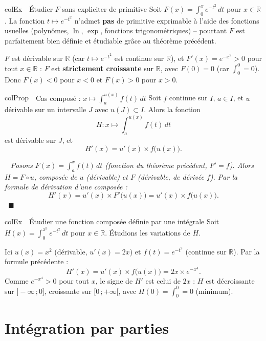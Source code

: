 \documentclass[11pt,a4paper]{article}
\newenvironment{propriete}[1][Propriété]
  {\begin{fiche}{colProp}{\ding{72}~~#1}}{\end{fiche}}
\newenvironment{exemple}[1][Exemple]
  {\begin{fiche}{colEx}{\ding{217}~~#1}}{\end{fiche}}
\newenvironment{demo}
  {\par\smallskip\noindent{\sffamily\bfseries\color{qtealdark}Démonstration.}\ \itshape}
  {\ \normalfont\hfill$\blacksquare$\par\medskip}
\begin{document}
\begin{exemple}[Étudier $F$ sans expliciter de primitive]
Soit $F(x)=\displaystyle\int_0^xe^{-t^2}\,dt$ pour $x\in\mathbb{R}$. La fonction $t\mapsto e^{-t^2}$ n'admet \textbf{pas} de primitive exprimable à l'aide des fonctions usuelles (polynômes, $\ln$, $\exp$, fonctions trigonométriques) -- pourtant $F$ est parfaitement bien définie et étudiable grâce au théorème précédent.

\smallskip
$F$ est dérivable sur $\mathbb{R}$ (car $t\mapsto e^{-t^2}$ est continue sur $\mathbb{R}$), et $F'(x)=e^{-x^2}>0$ pour tout $x\in\mathbb{R}$ : $F$ est \textbf{strictement croissante} sur $\mathbb{R}$, avec $F(0)=0$ (car $\int_0^0=0$). Donc $F(x)<0$ pour $x<0$ et $F(x)>0$ pour $x>0$.
\end{exemple}

\begin{propriete}[Cas composé : $x\mapsto\int_a^{u(x)}f(t)\,dt$]
Soit $f$ continue sur $I$, $a\in I$, et $u$ dérivable sur un intervalle $J$ avec $u(J)\subset I$. Alors la fonction
\[
  H : x \longmapsto \int_a^{u(x)}f(t)\,dt
\]
est dérivable sur $J$, et
\[
  H'(x) = u'(x)\times f\bigl(u(x)\bigr).
\]
\end{propriete}

\begin{demo}
Posons $F(x)=\int_a^xf(t)\,dt$ (fonction du théorème précédent, $F'=f$). Alors $H=F\circ u$, composée de $u$ (dérivable) et $F$ (dérivable, de dérivée $f$). Par la formule de dérivation d'une composée :
\[
  H'(x) = u'(x)\times F'\bigl(u(x)\bigr) = u'(x)\times f\bigl(u(x)\bigr).
\]
\end{demo}

\begin{exemple}[Étudier une fonction composée définie par une intégrale]
Soit $H(x)=\displaystyle\int_0^{x^2}e^{-t^2}\,dt$ pour $x\in\mathbb{R}$. Étudions les variations de $H$.

\smallskip
Ici $u(x)=x^2$ (dérivable, $u'(x)=2x$) et $f(t)=e^{-t^2}$ (continue sur $\mathbb{R}$). Par la formule précédente :
\[
  H'(x) = u'(x)\times f\bigl(u(x)\bigr) = 2x\times e^{-x^4}.
\]
Comme $e^{-x^4}>0$ pour tout $x$, le signe de $H'$ est celui de $2x$ : $H$ est décroissante sur $]-\infty\,;0]$, croissante sur $[0\,;+\infty[$, avec $H(0)=\int_0^0=0$ (minimum).
\end{exemple}

\section{Intégration par parties}
\end{document}
